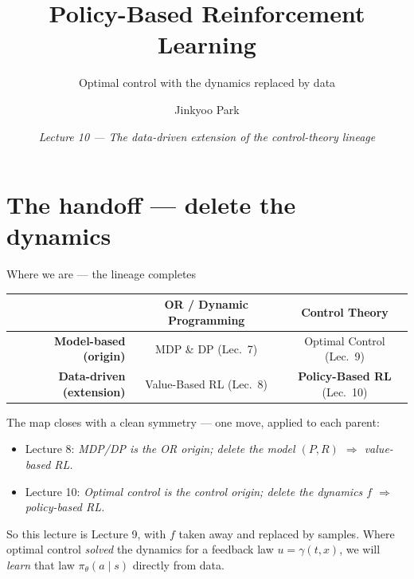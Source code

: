 \documentclass[10pt, aspectratio=169]{beamer}
\title{Policy-Based Reinforcement Learning}
\subtitle{Optimal control with the dynamics replaced by data}
\author{Jinkyoo Park}
\institute{KAIST}
\date{\textit{Lecture 10 --- The data-driven extension of the control-theory lineage}}
\begin{document}

\maketitle

\section{The handoff --- delete the dynamics}

\begin{frame}{Where we are --- the lineage completes}
\vspace{2pt}
\begin{center}\footnotesize
\renewcommand{\arraystretch}{1.35}
\begin{tabular}{r|c|c}
 & \textbf{OR / Dynamic Programming} & \textbf{Control Theory} \\
\hline
\textbf{Model-based (origin)}  & MDP \& DP \scriptsize(Lec.\ 7) & Optimal Control \scriptsize(Lec.\ 9)\\
\hline
\textbf{Data-driven (extension)} & Value-Based RL \scriptsize(Lec.\ 8) & \cellcolor{mDarkTeal!20}\textbf{Policy-Based RL} \scriptsize(\alert{Lec.\ 10})\\
\end{tabular}
\end{center}
\smallskip

The map closes with a clean symmetry --- one move, applied to each parent:
\begin{itemize}\setlength\itemsep{1pt}
\item Lecture 8: \emph{MDP/DP is the OR origin; \alert{delete the model $(P,R)$} $\Rightarrow$ value-based RL.}
\item Lecture 10: \emph{Optimal control is the control origin; \alert{delete the dynamics $f$} $\Rightarrow$ policy-based RL.}
\end{itemize}
\medskip

\pause
So this lecture is \alert{Lecture 9, with $f$ taken away and replaced by samples}. Where optimal control \emph{solved} the dynamics for a feedback law $u=\gamma(t,x)$, we will \emph{learn} that law $\pi_\theta(a\mid s)$ directly from data.
\end{frame}
\end{document}

